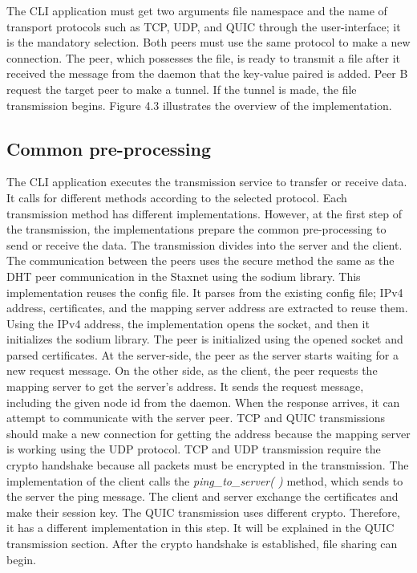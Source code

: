 The CLI application must get two arguments file namespace and the name of transport protocols such as TCP, UDP, and QUIC through the user-interface; it is the mandatory selection. Both peers must use the same protocol to make a new connection. The peer, which possesses the file, is ready to transmit a file after it received the message from the daemon that the key-value paired is added. Peer B request the target peer to make a tunnel. If the tunnel is made, the file transmission begins. Figure 4.3 illustrates the overview of the implementation.

\subsection{Common pre-processing}

The CLI application executes the transmission service to transfer or receive data. It calls for different methods according to the selected protocol. Each transmission method has different implementations. However, at the first step of the transmission, the implementations prepare the common pre-processing to send or receive the data. The transmission divides into the server and the client. The communication between the peers uses the secure method the same as the DHT peer communication in the Staxnet using the sodium library. This implementation reuses the config file. It parses from the existing config file; IPv4 address, certificates, and the mapping server address are extracted to reuse them. Using the IPv4 address, the implementation opens the socket, and then it initializes the sodium library. The peer is initialized using the opened socket and parsed certificates. At the server-side, the peer as the server starts waiting for a new request message. On the other side, as the client, the peer requests the mapping server to get the server’s address. It sends the request message, including the given node id from the daemon. When the response arrives, it can attempt to communicate with the server peer. TCP and QUIC transmissions should make a new connection for getting the address because the mapping server is working using the UDP protocol. TCP and UDP transmission require the crypto handshake because all packets must be encrypted in the transmission. The implementation of the client calls the \textit{ping\_to\_server( )} method, which sends to the server the ping message. The client and server exchange the certificates and make their session key. The QUIC transmission uses different crypto. Therefore, it has a different implementation in this step. It will be explained in the QUIC transmission section. After the crypto handshake is established, file sharing can begin.

